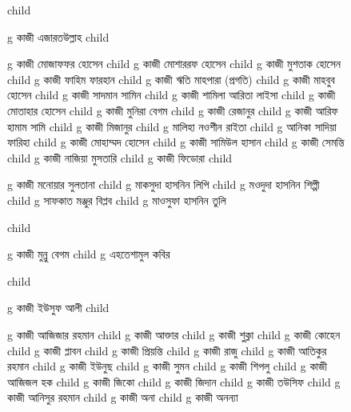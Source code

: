 \documentclass{article}
\begin{document}
\begin{figure}
{\begin{genealogypicture}
{{{{{        }
      }
        child{
        g{ কাজী এজারতউল্লাহ  }
          child{    g{ কাজী মোজাফফর হোসেন }
              child{
                g{ কাজী মোশাররফ হোসেন }
                  child{    g{ কাজী মুশতাক হোসেন }
                    child{    g{ কাজী ফাহিম ফারহান }   }
                    child{    g{ কাজী ঋতি মাহপারা (প্রগতি) }   }
                  }
                  child{    g{ কাজী মাহবুব হোসেন }
                    child{    g{ কাজী সাদমান সামিন  }   }
                    child{    g{ কাজী শামিলা আরিতা লাইসা }   }
                  }
              }
              child{
              g{ কাজী মোতাহার হোসেন  }
              child{    g{ কাজী মুনিরা বেগম }   }
              child{    g{ কাজী রেজানুর  } 
                  child{    g{ কাজী আরিফ হামাম সামি }   }
              }
              child{    g{ কাজী মিজানুর }  
                  child{    g{ মালিহা নওশীন রাইতা    }   }
                  child{    g{ আনিকা সাদিয়া ফারিহা }   }
              }
            }
            child{
              g{ কাজী মোহাম্মদ হোসেন }
              child{    g{ কাজী সামিউল হাসান  } 
                child{ g{ কাজী সেমন্তি }  }
                }
              child{    g{ কাজী নাজিয়া মুসতারি }
              child{ g{ কাজী ফিডোরা  }  }
              }
            }
            child{
              g{ কাজী মনোয়ার সুলতানা }
                child{ g{ মাকসুদা হাসনিন লিপি }  }
                child{ g{ মওদুদা হাসনিন শিল্পী }  }
                child{ g{ সাফকাত মঞ্জুর বিপ্লব }  }
                child{ g{ মাওসুফা হাসনিন তুলি }  }

            }%
            child{
              g{ কাজী মুন্নু বেগম}
               child{ g{ এহতেশামুল কবির }  }

            }

          }       
        }
      }
      child{
        g{ কাজী ইউসুফ আলী }
          child{    g{ কাজী আজিজার রহমান } 
              child{    g{ কাজী আক্তার }
                child{    g{ কাজী শুক্লা }   }
                child{    g{ কাজী কোহেন } 
                    child{    g{ কাজী প্লাবন }   }
                    child{    g{ কাজী প্রিয়ন্তি }   }
                  }
                child{    g{ কাজী রাজু }   }  
              }
              child{    g{ কাজী আতিকুর রহমান }   }
              child{    g{ কাজী ইউনুছ } 
                  child{    g{ কাজী সুমন }   }
                  child{    g{ কাজী শিপলু  }   }
              }
              child{    g{ কাজী আজিজল হক }
                  child{    g{ কাজী জিকো } child{    g{ কাজী জিদান }   }   }
                  child{    g{ কাজী তউসিফ }   }
              }
              child{    g{ কাজী আনিসুর রহমান } 
                  child{    g{ কাজী অনা  }   }
                  child{    g{ কাজী অনন্যা }   }
              }

}}}}
\end{genealogypicture}}
\end{figure}
\end{document}

